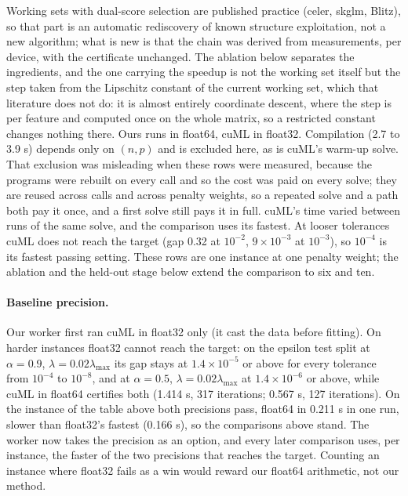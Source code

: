\documentclass[11pt]{article}
\begin{document}
Working sets with dual-score selection are published practice (celer,
skglm, Blitz), so that part is an automatic rediscovery of known structure
exploitation, not a new algorithm; what is new is that the chain was derived
from measurements, per device, with the certificate unchanged. The ablation
below separates the ingredients, and the one carrying the speedup is not the
working set itself but the step taken from the Lipschitz constant of the
current working set, which that literature does not do: it is almost entirely
coordinate descent, where the step is per feature and computed once on the
whole matrix, so a restricted constant changes nothing there. Ours runs in
float64, cuML in float32. Compilation (2.7 to 3.9 s) depends only on $(n, p)$
and is excluded here, as is cuML's warm-up solve. That exclusion was misleading
when these rows were measured, because the programs were rebuilt on every call
and so the cost was paid on every solve; they are reused across
calls and across penalty weights, so a repeated solve and a path both pay it
once, and a first solve still pays it in full. cuML's time varied between runs of the same solve,
and the comparison uses its fastest. At looser tolerances cuML does not reach
the target (gap 0.32 at $10^{-2}$, $9\times10^{-3}$ at $10^{-3}$), so $10^{-4}$ is its
fastest passing setting. These rows are one instance at one penalty weight; the
ablation and the held-out stage below extend the comparison to six and ten.

\paragraph{Baseline precision.}
Our worker first ran cuML in float32 only (it cast the data before fitting). On
harder instances float32 cannot reach the target: on the epsilon test split at
$\alpha=0.9$, $\lambda=0.02\lambda_{\max}$ its gap stays at $1.4\times10^{-5}$ or
above for every tolerance from $10^{-4}$ to $10^{-8}$, and at $\alpha=0.5$,
$\lambda=0.02\lambda_{\max}$ at $1.4\times10^{-6}$ or above, while cuML in float64
certifies both (1.414 s, 317 iterations; 0.567 s, 127 iterations). On the
instance of the table above both precisions pass, float64 in 0.211 s in one
run, slower than float32's fastest (0.166 s), so the comparisons above stand. The
worker now takes the precision as an option, and every later comparison uses,
per instance, the faster of the two precisions that reaches the target. Counting
an instance where float32 fails as a win would reward our float64 arithmetic,
not our method.
\end{document}
